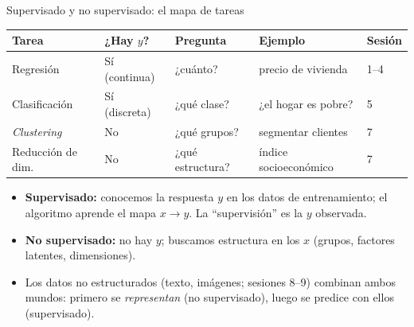 \documentclass{beamer}
\newcommand{\1}{\mathbb{I}}
\begin{document}
\begin{frame}{Supervisado y no supervisado: el mapa de tareas}
\small
\begin{center}
\footnotesize
\setlength{\tabcolsep}{4pt}
\begin{tabular}{lllll}
\hline
Tarea & ¿Hay $y$? & Pregunta & Ejemplo & Sesión \\
\hline
Regresión & Sí (continua) & ¿cuánto? & precio de vivienda & 1--4 \\
Clasificación & Sí (discreta) & ¿qué clase? & ¿el hogar es pobre? & 5 \\
\emph{Clustering} & No & ¿qué grupos? & segmentar clientes & 7 \\
Reducción de dim. & No & ¿qué estructura? & índice socioeconómico & 7 \\
\hline
\end{tabular}
\end{center}
\pause

\vspace{0.3cm}
\begin{itemize}\itemsep4pt
  \item \textbf{Supervisado:} conocemos la respuesta $y$ en los datos de entrenamiento; el algoritmo aprende el mapa $x \rightarrow y$. La ``supervisión'' es la $y$ observada.
  \item \textbf{No supervisado:} no hay $y$; buscamos estructura en los $x$ (grupos, factores latentes, dimensiones).
  \item Los datos no estructurados (texto, imágenes; sesiones 8--9) combinan ambos mundos: primero se \emph{representan} (no supervisado), luego se predice con ellos (supervisado).
\end{itemize}
\end{frame}
\end{document}
